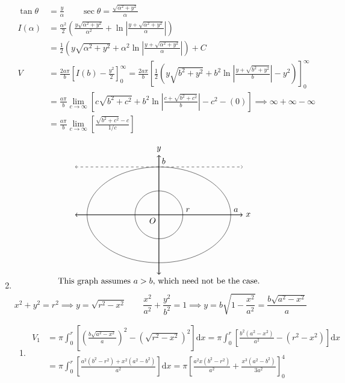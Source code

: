 \documentclass[12pt, A4]{report}
\renewcommand{\d}{\text{d}}
\begin{document}
\begin{enumerate}
\begin{align*}
						\tan\theta &= \frac{y}{\alpha} \qquad \sec\theta = \frac{\sqrt{\alpha^2 + y^2}}{\alpha} \\
						I(\alpha) &= \frac{\alpha^2}{2}\left(\frac{y\sqrt{\alpha^2 + y^2}}{\alpha^2} + \ln\left|\frac{y + \sqrt{\alpha^2 + y^2}}{\alpha}\right|\right) \\
							&= \frac{1}{2}\left(y\sqrt{\alpha^2 + y^2} + \alpha^2\ln\left|\frac{y + \sqrt{\alpha^2 + y^2}}{\alpha}\right|\right) + C \\
						V &= \frac{2a\pi}{b}\left[I(b) - \frac{y^2}{2}\right]_0^{\infty} 
								= \frac{2a\pi}{b}\left[\frac{1}{2}\left(y\sqrt{b^2 + y^2} + b^2\ln\left|\frac{y + \sqrt{b^2 + y^2}}{b}\right| - y^2\right)\right]_0^\infty \\
							&= \frac{a\pi}{b}\lim_{c\to\infty}\left[c\sqrt{b^2 + c^2} + b^2\ln\left|\frac{c + \sqrt{b^2 + c^2}}{b}\right| - c^2 - (0)\right] \implies \infty + \infty - \infty \\
							&= \frac{a\pi}{b}\lim_{c\to\infty}\left[\frac{\sqrt{b^2 + c^2} - c}{1/c}\right]
					\end{align*}
				\newpage\item
					\[\begin{tikzpicture}
						\draw[thick, <->] (-3.5, 0) -- (3.5, 0) node[anchor = west]{$x$};
						\draw[thick, <->] (0, -2.5) -- (0, 2.5) node[anchor = south]{$y$};
							\node[anchor = north east]{$O$};
						\draw[] circle[radius = 1];
							\node[anchor = south west] at (1, 0) {$r$};
						\draw[] ellipse(3cm and 2cm);
							\node[anchor = south west] at (0, 2) {$b$};
							\node[anchor = south west] at (3, 0) {$a$};
						\draw[dashed, <->] (-3.5, 2) -- (3.5, 2);
						\node[anchor = north] at (0, -2.5) {This graph assumes $a > b$, which need not be the case.};
					\end{tikzpicture}\]
					\[
						x^2 + y^2 = r^2 
								\implies y = \sqrt{r^2 - x^2} \qquad 
								\frac{x^2}{a^2} + \frac{y^2}{b^2} = 1 
									\implies y = b\sqrt{1 - \frac{x^2}{a^2}} = \frac{b\sqrt{a^2 - x^2}}{a}
					\]
					\begin{enumerate}
						\item
							\begin{align*}
								V_1 &= \pi\int_0^r\left[\left(\frac{b\sqrt{a^2 - x^2}}{a}\right)^2 - \left(\sqrt{r^2 - x^2}\right)^2\right]\d x
										= \pi\int_0^r\left[\frac{b^2(a^2 - x^2)}{a^2} - (r^2 - x^2)\right]\d x \\
									&= \pi\int_0^r\left[\frac{a^2(b^2 - r^2) + x^2(a^2 - b^2)}{a^2}\right]\d x 
										= \pi\left[\frac{a^2x(b^2 - r^2)}{a^2} + \frac{x^3(a^2 - b^2)}{3a^2}\right]_0^4 \\

\end{align*}
\end{enumerate}
\end{enumerate}
\end{document}
